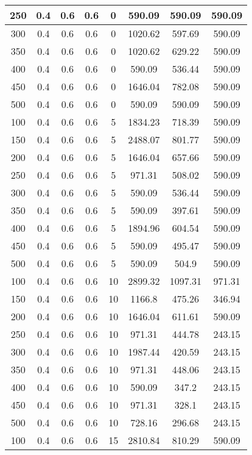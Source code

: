 \documentclass[a4paper, 12pt]{extreport}
\begin{document}
\begin{itemize}
\begin{longtable}{|c|c|c|c|c|c|c|c|}
			250 & 0.4 & 0.6 & 0.6 & 0 & 590.09 & 590.09 & 590.09 \\\hline
			300 & 0.4 & 0.6 & 0.6 & 0 & 1020.62 & 597.69 & 590.09 \\\hline
			350 & 0.4 & 0.6 & 0.6 & 0 & 1020.62 & 629.22 & 590.09 \\\hline
			400 & 0.4 & 0.6 & 0.6 & 0 & 590.09 & 536.44 & 590.09 \\\hline
			450 & 0.4 & 0.6 & 0.6 & 0 & 1646.04 & 782.08 & 590.09 \\\hline
			500 & 0.4 & 0.6 & 0.6 & 0 & 590.09 & 590.09 & 590.09 \\\hline
			100 & 0.4 & 0.6 & 0.6 & 5 & 1834.23 & 718.39 & 590.09 \\\hline
			150 & 0.4 & 0.6 & 0.6 & 5 & 2488.07 & 801.77 & 590.09 \\\hline
			200 & 0.4 & 0.6 & 0.6 & 5 & 1646.04 & 657.66 & 590.09 \\\hline
			250 & 0.4 & 0.6 & 0.6 & 5 & 971.31 & 508.02 & 590.09 \\\hline
			300 & 0.4 & 0.6 & 0.6 & 5 & 590.09 & 536.44 & 590.09 \\\hline
			350 & 0.4 & 0.6 & 0.6 & 5 & 590.09 & 397.61 & 590.09 \\\hline
			400 & 0.4 & 0.6 & 0.6 & 5 & 1894.96 & 604.54 & 590.09 \\\hline
			450 & 0.4 & 0.6 & 0.6 & 5 & 590.09 & 495.47 & 590.09 \\\hline
			500 & 0.4 & 0.6 & 0.6 & 5 & 590.09 & 504.9 & 590.09 \\\hline
			100 & 0.4 & 0.6 & 0.6 & 10 & 2899.32 & 1097.31 & 971.31 \\\hline
			150 & 0.4 & 0.6 & 0.6 & 10 & 1166.8 & 475.26 & 346.94 \\\hline
			200 & 0.4 & 0.6 & 0.6 & 10 & 1646.04 & 611.61 & 590.09 \\\hline
			250 & 0.4 & 0.6 & 0.6 & 10 & 971.31 & 444.78 & 243.15 \\\hline
			300 & 0.4 & 0.6 & 0.6 & 10 & 1987.44 & 420.59 & 243.15 \\\hline
			350 & 0.4 & 0.6 & 0.6 & 10 & 971.31 & 448.06 & 243.15 \\\hline
			400 & 0.4 & 0.6 & 0.6 & 10 & 590.09 & 347.2 & 243.15 \\\hline
			450 & 0.4 & 0.6 & 0.6 & 10 & 971.31 & 328.1 & 243.15 \\\hline
			500 & 0.4 & 0.6 & 0.6 & 10 & 728.16 & 296.68 & 243.15 \\\hline
			100 & 0.4 & 0.6 & 0.6 & 15 & 2810.84 & 810.29 & 590.09 \\\hline

\end{longtable}
\end{itemize}
\end{document}
